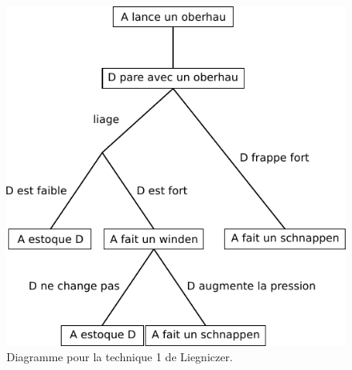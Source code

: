 \begin{technique}[Liegniczer 1]
\begin{figure}[htp]
	\centering
	\includegraphics{diagrammes/epee_bocle/liegniczer_1}
	\caption{Diagramme pour la technique 1 de Liegniczer.}
	\label{épée-bocle:fig:diagramme-liegniczer-1}
\end{figure}


\end{technique}


